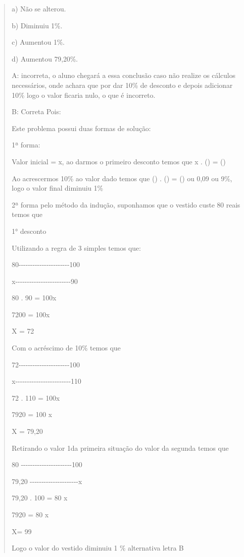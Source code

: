 \begin{quote}
\begin{escolha}
a) Não se alterou.

b) Diminuiu 1\%.

c) Aumentou 1\%.

d) Aumentou 79,20\%.

A: incorreta, o aluno chegará a essa conclusão caso não realize os
cálculos necessários, onde achara que por dar 10\% de desconto e depois
adicionar 10\% logo o valor ficaria nulo, o que é incorreto.

B: Correta Pois:

Este problema possui duas formas de solução:

1ª forma:

Valor inicial = x, ao darmos o primeiro desconto temos que x .
() = ()

Ao acrescermos 10\% ao valor dado temos que () .
() = () ou 0,09 ou 9\%, logo o valor final
diminuiu 1\%

2ª forma pelo método da indução, suponhamos que o vestido custe 80 reais
temos que

1° desconto

Utilizando a regra de 3 simples temos que:

80-\/-\/-\/-\/-\/-\/-\/-\/-\/-\/-\/-\/-\/-\/-\/-\/-\/-\/-\/-\/-\/-100

x-\/-\/-\/-\/-\/-\/-\/-\/-\/-\/-\/-\/-\/-\/-\/-\/-\/-\/-\/-\/-\/-\/-\/-90

80 . 90 = 100x

7200 = 100x

X = 72

Com o acréscimo de 10\% temos que

72-\/-\/-\/-\/-\/-\/-\/-\/-\/-\/-\/-\/-\/-\/-\/-\/-\/-\/-\/-\/-\/-100

x-\/-\/-\/-\/-\/-\/-\/-\/-\/-\/-\/-\/-\/-\/-\/-\/-\/-\/-\/-\/-\/-\/-\/-110

72 . 110 = 100x

7920 = 100 x

X = 79,20

Retirando o valor 1da primeira situação do valor da segunda temos que

80 -\/-\/-\/-\/-\/-\/-\/-\/-\/-\/-\/-\/-\/-\/-\/-\/-\/-\/-\/-\/-\/-100

79,20 -\/-\/-\/-\/-\/-\/-\/-\/-\/-\/-\/-\/-\/-\/-\/-\/-\/-\/-\/-\/-x

79,20 . 100 = 80 x

7920 = 80 x

X= 99

Logo o valor do vestido diminuiu 1 \% alternativa letra B


\end{escolha}
\end{quote}
